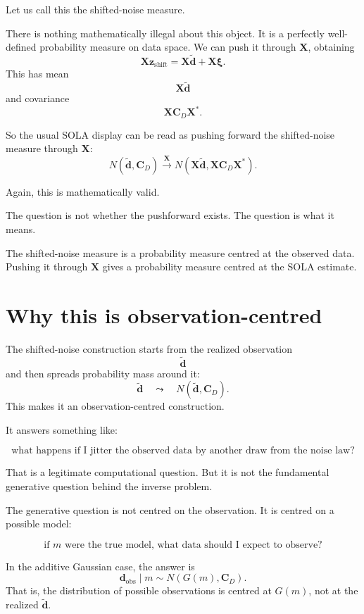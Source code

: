 \documentclass[11pt,openany]{book}
\theoremstyle{definition}
\theoremstyle{remark}
\begin{document}
Let us call this the shifted-noise measure.

There is nothing mathematically illegal about this object. It is a perfectly well-defined
probability measure on data space. We can push it through \(\mathbf X\), obtaining
\[
  \mathbf X\mathbf z_{\mathrm{shift}}
  =
  \mathbf X\widetilde{\mathbf d}
  +
  \mathbf X\boldsymbol\xi.
\]
This has mean
\[
  \mathbf X\widetilde{\mathbf d}
\]
and covariance
\[
  \mathbf X\mathbf C_D\mathbf X^*.
\]

So the usual SOLA display can be read as pushing forward the shifted-noise measure through
\(\mathbf X\):
\[
  N(\widetilde{\mathbf d},\mathbf C_D)
  \xrightarrow{\;\mathbf X\;}
  N(\mathbf X\widetilde{\mathbf d},\mathbf X\mathbf C_D\mathbf X^*).
\]

Again, this is mathematically valid.

The question is not whether the pushforward exists. The question is what it means.

\begin{checkpointbox}
The shifted-noise measure is a probability measure centred at the observed data. Pushing it
through \(\mathbf X\) gives a probability measure centred at the SOLA estimate.
\end{checkpointbox}

\section{Why this is observation-centred}

The shifted-noise construction starts from the realized observation
\[
  \widetilde{\mathbf d}
\]
and then spreads probability mass around it:
\[
  \widetilde{\mathbf d}
  \quad\leadsto\quad
  N(\widetilde{\mathbf d},\mathbf C_D).
\]
This makes it an observation-centred construction.

It answers something like:

\[
  \text{what happens if I jitter the observed data by another draw from the noise law?}
\]

That is a legitimate computational question. But it is not the fundamental generative question
behind the inverse problem.

The generative question is not centred on the observation. It is centred on a possible model:

\[
  \text{if }m\text{ were the true model, what data should I expect to observe?}
\]

In the additive Gaussian case, the answer is
\[
  \mathbf d_{\mathrm{obs}}
  \mid m
  \sim
  N(G(m),\mathbf C_D).
\]
That is, the distribution of possible observations is centred at \(G(m)\), not at the realized
\(\widetilde{\mathbf d}\).
\end{document}
